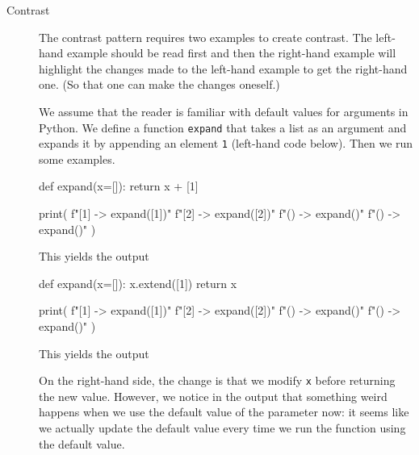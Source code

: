 \begin{description}
  \item[Contrast] The contrast pattern requires two examples to create 
    contrast.
    The left-hand example should be read first and then the right-hand 
    example will highlight the changes made to the left-hand example to get 
    the right-hand one.
    (So that one can make the changes oneself.)

    We assume that the reader is familiar with default values for arguments in 
    Python.
    We define a function \texttt{expand} that takes a list as an 
    argument and expands it by appending an element \texttt{1} 
    (left-hand code below).
    Then we run some examples.

    \begin{minipage}[t]{0.45\columnwidth}
      \begin{pyblock}[default1]
def expand(x=[]):
  return x + [1]


print(
  f"[1] -> {expand([1])}\n"
  f"[2] -> {expand([2])}\n"
  f"()  -> {expand()}\n"
  f"()  -> {expand()}\n"
)
      \end{pyblock}
      \vspace{0.5em}
      This yields the output
      \vspace{0.5em}
      \printpythontex[verbatim]
    \end{minipage}
    \hfill
    \begin{minipage}[t]{0.45\columnwidth}
      \begin{pyblock}[default2][highlightlines={2-3}]
def expand(x=[]):
  x.extend([1])
  return x

print(
  f"[1] -> {expand([1])}\n"
  f"[2] -> {expand([2])}\n"
  f"()  -> {expand()}\n"
  f"()  -> {expand()}\n"
)
      \end{pyblock}

      \vspace{0.5em}
      This yields the output
      \vspace{0.5em}
      \printpythontex[verbatim][highlightlines={4}]
    \end{minipage}

    On the right-hand side, the change is that we modify \texttt{x} 
    before returning the new value.
    However, we notice in the output that something weird happens when we use 
    the default value of the parameter now:
    it seems like we actually update the default value every time we run the 
    function using the default value.


\end{description}
